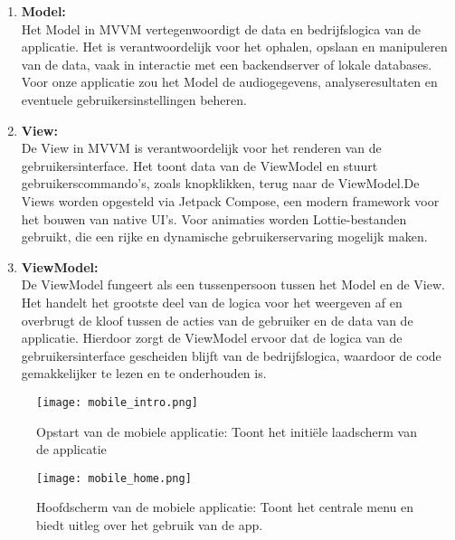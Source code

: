 \begin{enumerate}[label=\arabic*.]
    
    \item \textbf{Model:}\\
    Het Model in MVVM vertegenwoordigt de data en bedrijfslogica van de applicatie. Het is verantwoordelijk voor het ophalen, opslaan en manipuleren van de data, vaak in interactie met een backendserver of lokale databases. Voor onze applicatie zou het Model de audiogegevens, analyseresultaten en eventuele gebruikersinstellingen beheren.
    
    
    \item \textbf{View:}\\
De View in MVVM is verantwoordelijk voor het renderen van de gebruikersinterface. Het toont data van de ViewModel en stuurt gebruikerscommando's, zoals knopklikken, terug naar de ViewModel.De Views worden opgesteld via Jetpack Compose, een modern framework voor het bouwen van native UI's. Voor animaties worden Lottie-bestanden gebruikt, die een rijke en dynamische gebruikerservaring mogelijk maken.
    
    
    \item \textbf{ViewModel:}\\
    De ViewModel fungeert als een tussenpersoon tussen het Model en de View. Het handelt het grootste deel van de logica voor het weergeven af en overbrugt de kloof tussen de acties van de gebruiker en de data van de applicatie. Hierdoor zorgt de ViewModel ervoor dat de logica van de gebruikersinterface gescheiden blijft van de bedrijfslogica, waardoor de code gemakkelijker te lezen en te onderhouden is.
    
\end{enumerate}
\pagebreak





\begin{figure}[h]
    \centering
    \texttt{[image: mobile\_intro.png]}
    \captionsetup{justification=centering}
    \caption{Opstart van de mobiele applicatie: Toont het initiële laadscherm van de applicatie}
    \label{fig:mobile_intro}
\end{figure}

\begin{figure}[h]
    \centering
    \texttt{[image: mobile\_home.png]}
    \captionsetup{justification=centering}
    \caption{Hoofdscherm van de mobiele applicatie: Toont het centrale menu en biedt uitleg over het gebruik van de app.}    \label{fig:mobile_intro}
\end{figure}

